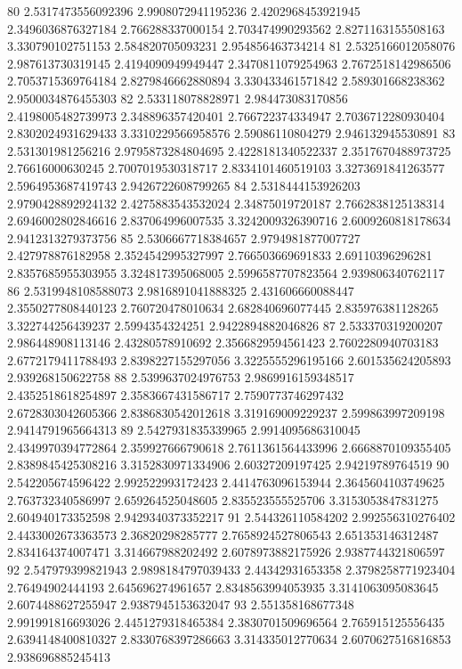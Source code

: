 80 2.5317473556092396 2.9908072941195236 2.4202968453921945 2.3496036876327184 2.766288337000154 2.703474990293562 2.8271163155508163 3.330790102751153 2.584820705093231 2.954856463734214
81 2.5325166012058076 2.987613730319145 2.4194090949949447 2.3470811079254963 2.7672518142986506 2.7053715369764184 2.8279846662880894 3.330433461571842 2.589301668238362 2.9500034876455303
82 2.533118078828971 2.984473083170856 2.4198005482739973 2.348896357420401 2.766722374334947 2.7036712280930404 2.8302024931629433 3.3310229566958576 2.59086110804279 2.946132945530891
83 2.531301981256216 2.9795873284804695 2.4228181340522337 2.3517670488973725 2.76616000630245 2.7007019530318717 2.8334101460519103 3.3273691841263577 2.5964953687419743 2.9426722608799265
84 2.5318444153926203 2.9790428892924132 2.4275883543532024 2.34875019720187 2.7662838125138314 2.6946002802846616 2.837064996007535 3.3242009326390716 2.6009260818178634 2.9412313279373756
85 2.5306667718384657 2.9794981877007727 2.427978876182958 2.3524542995327997 2.766503669691833 2.69110396296281 2.8357685955303955 3.324817395068005 2.5996587707823564 2.939806340762117
86 2.5319948108588073 2.9816891041888325 2.431606660088447 2.3550277808440123 2.760720478010634 2.682840696077445 2.835976381128265 3.322744256439237 2.5994354324251 2.9422894882046826
87 2.533370319200207 2.986448908113146 2.43280578910692 2.3566829594561423 2.7602280940703183 2.6772179411788493 2.8398227155297056 3.3225555296195166 2.601535624205893 2.939268150622758
88 2.5399637024976753 2.9869916159348517 2.4352518618254897 2.3583667431586717 2.7590773746297432 2.6728303042605366 2.8386830542012618 3.319169009229237 2.599863997209198 2.9414791965664313
89 2.5427931835339965 2.9914095686310045 2.4349970394772864 2.359927666790618 2.7611361564433996 2.6668870109355405 2.8389845425308216 3.3152830971334906 2.60327209197425 2.94219789764519
90 2.542205674596422 2.992522993172423 2.4414763096153944 2.3645604103749625 2.763732340586997 2.659264525048605 2.835523555525706 3.3153053847831275 2.604940173352598 2.9429340373352217
91 2.544326110584202 2.992556310276402 2.4433002673363573 2.36820298285777 2.7658924527806543 2.651353146312487 2.834164374007471 3.314667988202492 2.6078973882175926 2.9387744321806597
92 2.547979399821943 2.9898184797039433 2.44342931653358 2.3798258771923404 2.76494902444193 2.645696274961657 2.8348563994053935 3.3141063095083645 2.6074488627255947 2.9387945153632047
93 2.551358168677348 2.991991816693026 2.4451279318465384 2.3830701509696564 2.765915125556435 2.6394148400810327 2.8330768397286663 3.314335012770634 2.6070627516816853 2.938696885245413
